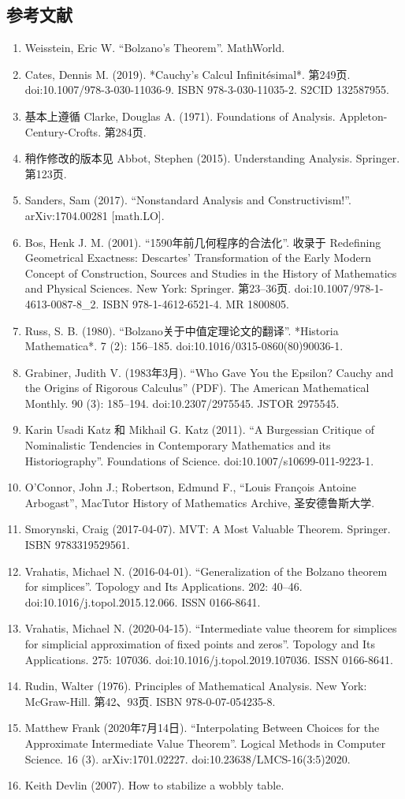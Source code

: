 \subsection{参考文献}
\begin{enumerate}
\item Weisstein, Eric W. “Bolzano’s Theorem”. MathWorld.
\item Cates, Dennis M. (2019). *Cauchy's Calcul Infinitésimal*. 第249页. doi:10.1007/978-3-030-11036-9. ISBN 978-3-030-11035-2. S2CID 132587955.
\item 基本上遵循 Clarke, Douglas A. (1971). Foundations of Analysis. Appleton-Century-Crofts. 第284页.
\item 稍作修改的版本见 Abbot, Stephen (2015). Understanding Analysis. Springer. 第123页.
\item Sanders, Sam (2017). “Nonstandard Analysis and Constructivism!”. arXiv:1704.00281 [math.LO].
\item Bos, Henk J. M. (2001). “1590年前几何程序的合法化”. 收录于 Redefining Geometrical Exactness: Descartes' Transformation of the Early Modern Concept of Construction, Sources and Studies in the History of Mathematics and Physical Sciences. New York: Springer. 第23–36页. doi:10.1007/978-1-4613-0087-8\_2. ISBN 978-1-4612-6521-4. MR 1800805.
\item Russ, S. B. (1980). “Bolzano关于中值定理论文的翻译”. *Historia Mathematica*. 7 (2): 156–185. doi:10.1016/0315-0860(80)90036-1.
\item Grabiner, Judith V. (1983年3月). “Who Gave You the Epsilon? Cauchy and the Origins of Rigorous Calculus” (PDF). The American Mathematical Monthly. 90 (3): 185–194. doi:10.2307/2975545. JSTOR 2975545.
\item Karin Usadi Katz 和 Mikhail G. Katz (2011). “A Burgessian Critique of Nominalistic Tendencies in Contemporary Mathematics and its Historiography”. Foundations of Science. doi:10.1007/s10699-011-9223-1.
\item O'Connor, John J.; Robertson, Edmund F., “Louis François Antoine Arbogast”, MacTutor History of Mathematics Archive, 圣安德鲁斯大学.
\item Smorynski, Craig (2017-04-07). MVT: A Most Valuable Theorem. Springer. ISBN 9783319529561.
\item Vrahatis, Michael N. (2016-04-01). “Generalization of the Bolzano theorem for simplices”. Topology and Its Applications. 202: 40–46. doi:10.1016/j.topol.2015.12.066. ISSN 0166-8641.
\item Vrahatis, Michael N. (2020-04-15). “Intermediate value theorem for simplices for simplicial approximation of fixed points and zeros”. Topology and Its Applications. 275: 107036. doi:10.1016/j.topol.2019.107036. ISSN 0166-8641.
\item Rudin, Walter (1976). Principles of Mathematical Analysis. New York: McGraw-Hill. 第42、93页. ISBN 978-0-07-054235-8.
\item Matthew Frank (2020年7月14日). “Interpolating Between Choices for the Approximate Intermediate Value Theorem”. Logical Methods in Computer Science. 16 (3). arXiv:1701.02227. doi:10.23638/LMCS-16(3:5)2020.
\item Keith Devlin (2007). How to stabilize a wobbly table.
\end{enumerate}
